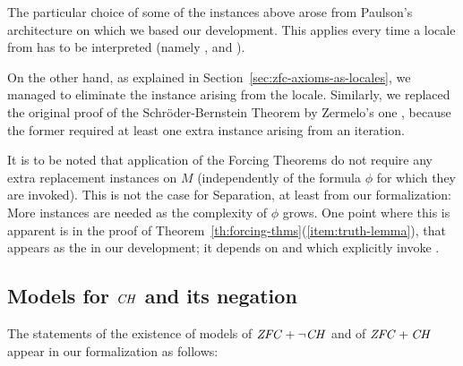The particular choice of some of the instances above arose from
Paulson's architecture on which we based our development.
This applies every time
a locale from  has to be
interpreted (namely 
, and ).

On the other hand, as explained in
Section~\ref{sec:zfc-axioms-as-locales}, we managed to eliminate the
instance arising from the  locale. Similarly,
we replaced the original proof of the Schröder-Bernstein Theorem by
Zermelo's one \cite[Exr. x4.27]{moschovakis1994notes}, because the
former required at least one extra instance
arising from an iteration.

It is to be noted that application of the Forcing Theorems do not
require any extra replacement instances on $M$ (independently of the
formula $\phi$ for which they are invoked). This is not the case for
Separation, at least from our formalization: More instances are needed
as the complexity of $\phi$ grows. One point where this is apparent is
in the proof of Theorem~\ref{th:forcing-thms}(\ref{item:truth-lemma}),
that appears as the  in our development; it
depends on  and
 which explicitly invoke
.

\subsection{Models for $\mathit{CH}$ and its negation}
\label{sec:models-ch-negation}

The statements of the existence of models of $\mathit{ZFC} + \neg\mathit{CH}$ and of
$\mathit{ZFC} + \mathit{CH}$  appear in our formalization as follows:

